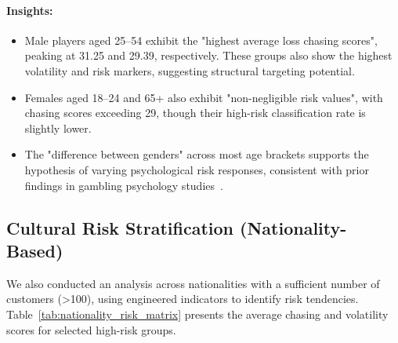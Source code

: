 \documentclass[12pt,a4paper]{report}
\begin{document}
\paragraph{Insights:}
\begin{itemize}
    \item Male players aged 25–54 exhibit the "highest average loss chasing scores", peaking at 31.25 and 29.39, respectively. These groups also show the highest volatility and risk markers, suggesting structural targeting potential.
    \item Females aged 18–24 and 65+ also exhibit "non-negligible risk values", with chasing scores exceeding 29, though their high-risk classification rate is slightly lower.
    \item The "difference between genders" across most age brackets supports the hypothesis of varying psychological risk responses, consistent with prior findings in gambling psychology studies~\citep{ghaharian2022b,ghaharian2022c, responsiblegamblingreview}.
\end{itemize}

\subsection{Cultural Risk Stratification (Nationality-Based)}

We also conducted an analysis across nationalities with a sufficient number of customers (\textgreater100), using engineered indicators to identify risk tendencies. Table~\ref{tab:nationality_risk_matrix} presents the average chasing and volatility scores for selected high-risk groups.
\end{document}
